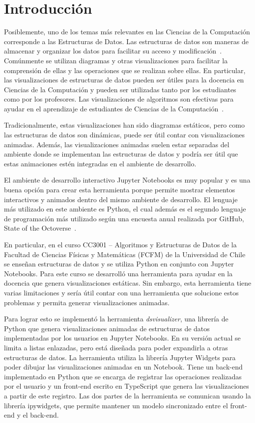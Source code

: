 \chapter{Introducción}

Posiblemente, uno de los temas más relevantes en las Ciencias de la Computación corresponde a las Estructuras de Datos. Las estructuras de datos son maneras de almacenar y organizar los datos para facilitar su acceso y modificación~\cite{Algorithms}. Comúnmente se utilizan diagramas y otras visualizaciones para facilitar la comprensión de ellas y las operaciones que se realizan sobre ellas. En particular, las visualizaciones de estructuras de datos pueden ser útiles para la docencia en Ciencias de la Computación y pueden ser utilizadas tanto por los estudiantes como por los profesores. Las visualizaciones de algoritmos son efectivas para ayudar en el aprendizaje de estudiantes de Ciencias de la Computación~\cite{Hundhausen2002}.

Tradicionalmente, estas visualizaciones han sido diagramas estáticos, pero como las estructuras de datos son dinámicas, puede ser útil contar con visualizaciones animadas. Además, las visualizaciones animadas suelen estar separadas del ambiente donde se implementan las estructuras de datos y podría ser útil que estas animaciones estén integradas en el ambiente de desarrollo.

El ambiente de desarrollo interactivo Jupyter Notebooks es muy popular y es una buena opción para crear esta herramienta porque permite mostrar elementos interactivos y animados dentro del mismo ambiente de desarrollo. El lenguaje más utilizado en este ambiente es Python, el cual además es el segundo lenguaje de programación más utilizado según una encuesta anual realizada por GitHub, State of the Octoverse~\cite{encuesta-github}.

En particular, en el curso CC3001 -- Algoritmos y Estructuras de Datos de la Facultad de Ciencias Físicas y Matemáticas (FCFM) de la Universidad de Chile se enseñan estructuras de datos y se utiliza Python en conjunto con Jupyter Notebooks. Para este curso se desarrolló una herramienta para ayudar en la docencia que genera visualizaciones estáticas. Sin embargo, esta herramienta tiene varias limitaciones y sería útil contar con una herramienta que solucione estos problemas y permita generar visualizaciones animadas. 

Para lograr esto se implementó la herramienta \textit{dsvisualizer}, una librería de Python que genera visualizaciones animadas de estructuras de datos implementadas por los usuarios en Jupyter Notebooks. En su versión actual se limita a listas enlazadas, pero está diseñada para poder expandirla a otras estructuras de datos. La herramienta utiliza la librería Jupyter Widgets para poder dibujar las visualizaciones animadas en un Notebook. Tiene un back-end implementado en Python que se encarga de registrar las operaciones realizadas por el usuario y un front-end escrito en TypeScript que genera las visualizaciones a partir de este registro. Las dos partes de la herramienta se comunican usando la librería ipywidgets, que permite mantener un modelo sincronizado entre el front-end y el back-end.

